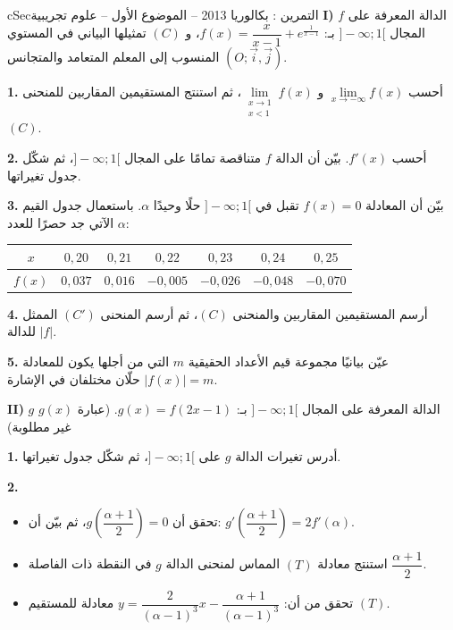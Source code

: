 \documentclass[12pt,a4paper]{article}
\newenvironment{BOX}[2]{\begin{otherlanguage}{english}\begin{arbox}{#1}{#2}}{\end{arbox}\end{otherlanguage}}
\newcounter{exo}
\newenvironment{tamrin}[1]{\stepcounter{exo}\begin{BOX}{cSec}{التمرين \theexo: #1}}{\end{BOX}}
\newenvironment{sq}{\begin{itemize}[leftmargin=2.4em,itemsep=3pt]}{\end{itemize}}
\newcommand{\qa}{\item[(أ)]}\newcommand{\qb}{\item[(ب)]}\newcommand{\qc}{\item[(جـ)]}\newcommand{\qd}{\item[(د)]}\newcommand{\qe}{\item[(هـ)]}
\newcommand{\QQ}[1]{\par\smallskip\textbf{#1.} }
\begin{document}
\begin{tamrin}{بكالوريا 2013 -- الموضوع الأول -- علوم تجريبية}
\textbf{I)} $f$ الدالة المعرفة على المجال $]{-}\infty;1[$ بـ: $f(x)=\dfrac{x}{x-1}+e^{\frac{1}{x-1}}$، و $(C)$ تمثيلها البياني في المستوي المنسوب إلى المعلم المتعامد والمتجانس $(O;\vec i,\vec j)$.

\QQ{1} أحسب $\lim\limits_{x\to-\infty}f(x)$ و $\lim\limits_{\substack{x\to1\\x<1}}f(x)$، ثم استنتج المستقيمين المقاربين للمنحنى $(C)$.
\QQ{2} أحسب $f'(x)$. بيّن أن الدالة $f$ متناقصة تمامًا على المجال $]{-}\infty;1[$، ثم شكّل جدول تغيراتها.
\QQ{3} بيّن أن المعادلة $f(x)=0$ تقبل في $]{-}\infty;1[$ حلًا وحيدًا $\alpha$. باستعمال جدول القيم الآتي جد حصرًا للعدد $\alpha$:
\begin{center}
\begin{tabular}{|c|c|c|c|c|c|c|}\hline
\rowcolor{cSec!12}$x$ & $0{,}20$ & $0{,}21$ & $0{,}22$ & $0{,}23$ & $0{,}24$ & $0{,}25$\\\hline
$f(x)$ & $0{,}037$ & $0{,}016$ & $-0{,}005$ & $-0{,}026$ & $-0{,}048$ & $-0{,}070$\\\hline
\end{tabular}
\end{center}
\QQ{4} أرسم المستقيمين المقاربين والمنحنى $(C)$، ثم أرسم المنحنى $(C')$ الممثل للدالة $|f|$.
\QQ{5} عيّن بيانيًا مجموعة قيم الأعداد الحقيقية $m$ التي من أجلها يكون للمعادلة $|f(x)|=m$ حلّان مختلفان في الإشارة.

\textbf{II)} $g$ الدالة المعرفة على المجال $]{-}\infty;1[$ بـ: $g(x)=f(2x-1)$. (عبارة $g(x)$ غير مطلوبة)

\QQ{1} أدرس تغيرات الدالة $g$ على $]{-}\infty;1[$، ثم شكّل جدول تغيراتها.
\QQ{2}
\begin{sq}
\qa تحقق أن $g\left(\dfrac{\alpha+1}{2}\right)=0$، ثم بيّن أن: $g'\left(\dfrac{\alpha+1}{2}\right)=2f'(\alpha)$.
\qb استنتج معادلة $(T)$ المماس لمنحنى الدالة $g$ في النقطة ذات الفاصلة $\dfrac{\alpha+1}{2}$.
\qc تحقق من أن: $y=\dfrac{2}{(\alpha-1)^3}x-\dfrac{\alpha+1}{(\alpha-1)^3}$ معادلة للمستقيم $(T)$.
\end{sq}
\end{tamrin}
\end{document}
